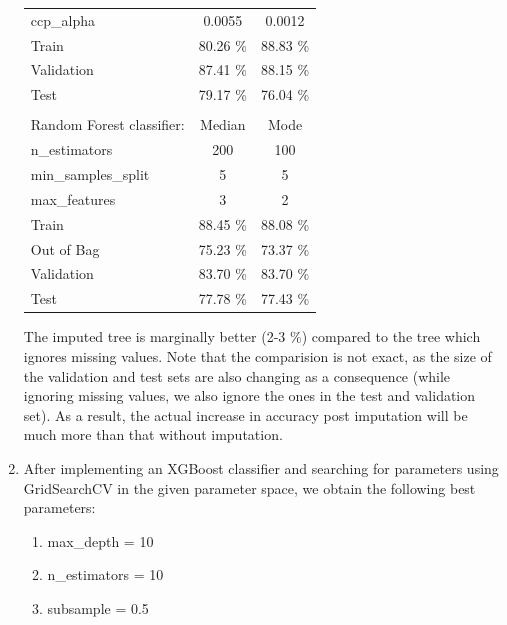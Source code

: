 \documentclass[12pt]{article}
\begin{document}
\begin{enumerate}[label=(\alph*)]
\begin{center}
\begin{tabular}{l c c}
        \hspace{3mm} ccp\_alpha & 0.0055 & 0.0012 \\
        \hspace{3mm} Train & 80.26 \% & 88.83 \% \\
        \hspace{3mm} Validation & 87.41 \% & 88.15 \% \\
        \hspace{3mm} Test & 79.17 \% & 76.04 \% \\
            & & \\
        Random Forest classifier: & Median & Mode \\
        \hline
        \hspace{3mm} n\_estimators & 200 & 100 \\
        \hspace{3mm} min\_samples\_split & 5 & 5 \\
        \hspace{3mm} max\_features & 3 & 2 \\
        \hspace{3mm} Train & 88.45 \% & 88.08 \% \\
        \hspace{3mm} Out of Bag & 75.23 \% & 73.37 \% \\
        \hspace{3mm} Validation & 83.70 \% & 83.70 \% \\
        \hspace{3mm} Test & 77.78 \% & 77.43 \% \\
    \end{tabular}
    \end{center}

    The imputed tree is marginally better (2-3 \%) compared to the tree which 
    ignores missing values. Note that the comparision is not exact, as the size 
    of the validation and test sets are also changing as a consequence (while 
    ignoring missing values, we also ignore the ones in the test and validation 
    set). As a result, the actual increase in accuracy post imputation will be 
    much more than that without imputation.
    
    \item After implementing an XGBoost classifier and searching for parameters
    using GridSearchCV in the given parameter space, we obtain the following 
    best parameters:
    \begin{enumerate}[label=(\roman*)]
        \item max\_depth = 10
        \item n\_estimators = 10
        \item subsample = 0.5
    \end{enumerate}


\end{enumerate}
\end{document}
